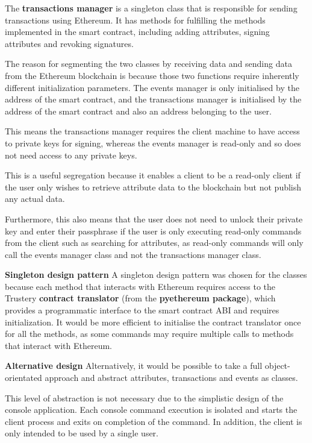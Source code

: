 \documentclass[12pt,a4paper]{report}
\begin{document}
	The \textbf{transactions manager} is a singleton class that is responsible for sending transactions using Ethereum. It has methods for fulfilling the methods implemented in the smart contract, including adding attributes, signing attributes and revoking signatures.
	
	The reason for segmenting the two classes by receiving data and sending data from the Ethereum blockchain is because those two functions require inherently different initialization parameters. The events manager is only initialised by the address of the smart contract, and the transactions manager is initialised by the address of the smart contract and also an address belonging to the user.
	
	This means the transactions manager requires the client machine to have access to private keys for signing, whereas the events manager is read-only and so does not need access to any private keys.
	
	This is a useful segregation because it enables a client to be a read-only client if the user only wishes to retrieve attribute data to the blockchain but not publish any actual data.
	
	Furthermore, this also means that the user does not need to unlock their private key and enter their passphrase if the user is only executing read-only commands from the client such as searching for attributes, as read-only commands will only call the events manager class and not the transactions manager class.
	
	\bigskip
	\noindent \textbf{Singleton design pattern}\newline
	A singleton design pattern was chosen for the classes because each method that interacts with Ethereum requires access to the Trustery \textbf{contract translator} (from the \textbf{pyethereum package}), which provides a programmatic interface to the smart contract ABI and requires initialization. It would be more efficient to initialise the contract translator once for all the methods, as some commands may require multiple calls to methods that interact with Ethereum.
	
	\bigskip
	\noindent \textbf{Alternative design}\newline
	Alternatively, it would be possible to take a full object-orientated approach and abstract attributes, transactions and events as classes.
	
	This level of abstraction is not necessary due to the simplistic design of the console application. Each console command execution is isolated and starts the client process and exits on completion of the command. In addition, the client is only intended to be used by a single user.
	
\end{document}

